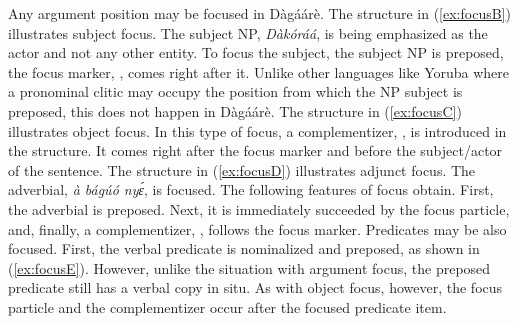 \begin{refsection}
\ea {}
\z\z 

Any argument position may be focused in Dàgáárè.
The structure in (\ref{ex:focusB}) illustrates subject
focus. The subject NP, \textit{Dàkóráá}, is being emphasized as the actor and not any other entity.
To focus the subject, the subject NP is preposed, the focus marker, \textsc{{\FOC}}, comes right after it.
Unlike other languages like Yoruba where a pronominal clitic may occupy the position from
which the NP subject is preposed, this does not happen in Dàgáárè. The structure
in (\ref{ex:focusC})
illustrates object focus. In this type of focus, a complementizer, {\COMP}, is introduced in the
structure. It comes right after the focus marker and before the subject/actor of the sentence.
The structure in (\ref{ex:focusD}) illustrates adjunct focus. The adverbial, \textit{à bágúó nyɛ́}, is focused.
The following features of focus obtain. First, the adverbial is preposed. Next, it is
immediately succeeded by the focus particle, and, finally, a complementizer, {\COMP}, follows
the focus marker. Predicates may be also focused. First, the verbal predicate is nominalized
and preposed, as shown in (\ref{ex:focusE}). However, unlike the situation with argument focus, the
preposed predicate still has a verbal copy in situ. As with object focus, however, the focus
particle and the complementizer occur after the focused predicate item.




\end{refsection}
